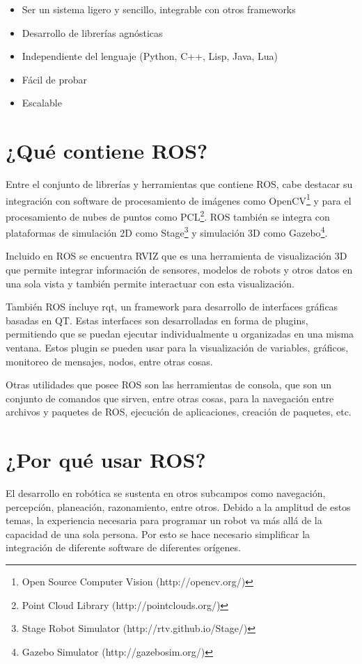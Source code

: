 \begin{itemize}
\item Ser un sistema ligero y sencillo, integrable con otros frameworks
\item Desarrollo de librerías agnósticas
\item Independiente del lenguaje (Python, C++, Lisp, Java, Lua)
\item Fácil de probar
\item Escalable
\end{itemize}


\section{¿Qué contiene ROS?}

Entre el conjunto de librerías y herramientas que contiene ROS, cabe destacar su integración con software de procesamiento de imágenes como OpenCV\footnote{Open Source Computer Vision (http://opencv.org/)} y para el procesamiento de nubes de puntos como PCL\footnote{Point Cloud Library (http://pointclouds.org/)}. ROS también se integra con plataformas de simulación 2D como Stage\footnote{Stage Robot Simulator (http://rtv.github.io/Stage/)} y simulación 3D como Gazebo\footnote{Gazebo Simulator (http://gazebosim.org/)}.


Incluido en ROS se encuentra RVIZ que es una herramienta de visualización 3D que permite integrar información de sensores, modelos de robots y otros datos en una sola vista y también permite interactuar con esta visualización.

También ROS incluye rqt, un framework para desarrollo de interfaces gráficas basadas en QT. Estas interfaces son desarrolladas en forma de plugins, permitiendo que se puedan ejecutar individualmente u organizadas en una misma ventana. Estos plugin se pueden usar para la visualización de variables, gráficos, monitoreo de mensajes, nodos, entre otras cosas.

Otras utilidades que posee ROS son las herramientas de consola, que son un conjunto de comandos que sirven, entre otras cosas, para la navegación entre archivos y paquetes de ROS, ejecución de aplicaciones, creación de paquetes, etc.


\section{¿Por qué usar ROS?}

El desarrollo en robótica se sustenta en otros subcampos como navegación, percepción, planeación, razonamiento, entre otros. Debido a la amplitud de estos temas, la experiencia necesaria para programar un robot va más allá de la capacidad de una sola persona. Por esto se hace necesario simplificar la integración de diferente software de diferentes orígenes.

